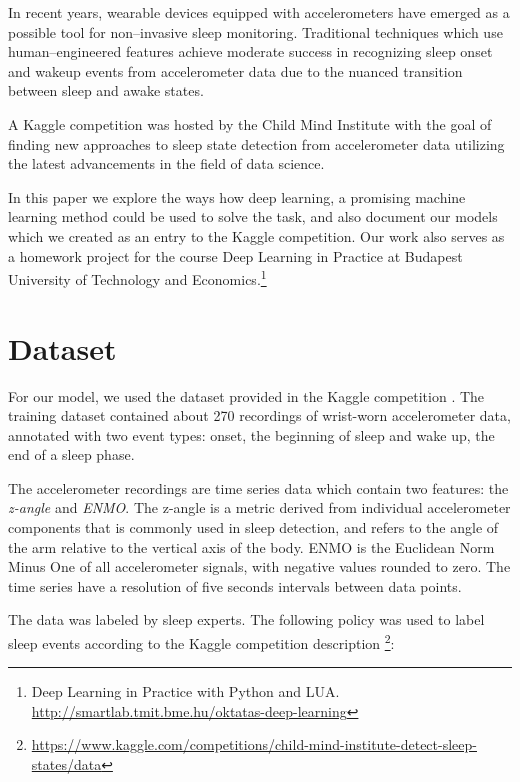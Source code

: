 \documentclass{article}
\begin{document}
In recent years, wearable devices equipped with accelerometers have emerged as a possible tool for non–invasive sleep monitoring. Traditional techniques which use human–engineered features achieve moderate success in recognizing sleep onset and wakeup events from accelerometer data due to the nuanced transition between sleep and awake states.

A Kaggle competition was hosted by the Child Mind Institute \cite{child-mind-institute-detect-sleep-states} with the goal of finding new approaches to sleep state detection from accelerometer data utilizing the latest advancements in the field of data science.

In this paper we explore the ways how deep learning, a promising machine learning method could be used to solve the task, and also document our models which we created as an entry to the Kaggle competition. Our work also serves as a homework project for the course Deep Learning in Practice at Budapest University of Technology and Economics.\footnote{Deep Learning in Practice with Python and LUA. \url{http://smartlab.tmit.bme.hu/oktatas-deep-learning}}


\section{Dataset}
\label{dataset}

For our model, we used the dataset provided in the Kaggle competition \cite{child-mind-institute-detect-sleep-states}. The training dataset contained about 270 recordings of wrist-worn accelerometer data, annotated with two event types: onset, the beginning of sleep and wake up, the end of a sleep phase. 

The accelerometer recordings are time series data which contain two features: the \textit{z-angle} and \textit{ENMO}. The z-angle is a metric derived from individual accelerometer components that is commonly used in sleep detection, and refers to the angle of the arm relative to the vertical axis of the body. ENMO is the Euclidean Norm Minus One of all accelerometer signals, with negative values rounded to zero. The time series have a resolution of five seconds intervals between data points.

The data was labeled by sleep experts. The following policy was used to label sleep events according to the Kaggle competition description \footnote{\url{https://www.kaggle.com/competitions/child-mind-institute-detect-sleep-states/data}}:
\end{document}
